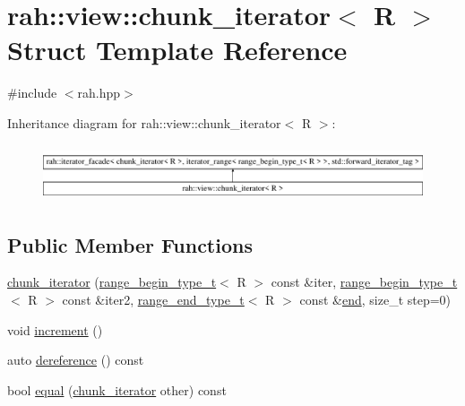 \hypertarget{structrah_1_1view_1_1chunk__iterator}{}\section{rah\+::view\+::chunk\+\_\+iterator$<$ R $>$ Struct Template Reference}
\label{structrah_1_1view_1_1chunk__iterator}


{\ttfamily \#include $<$rah.\+hpp$>$}

Inheritance diagram for rah\+::view\+::chunk\+\_\+iterator$<$ R $>$\+:\begin{figure}[H]
\begin{center}
\leavevmode
\includegraphics[height=1.669151cm]{structrah_1_1view_1_1chunk__iterator}
\end{center}
\end{figure}
\subsection*{Public Member Functions}
\begin{DoxyCompactItemize}
\item 
\mbox{\hyperlink{structrah_1_1view_1_1chunk__iterator_a2675282334475c594c96fdcc6c646895}{chunk\+\_\+iterator}} (\mbox{\hyperlink{namespacerah_afa7f59d1f37c7b9d9caed37551be9eaa}{range\+\_\+begin\+\_\+type\+\_\+t}}$<$ R $>$ const \&iter, \mbox{\hyperlink{namespacerah_afa7f59d1f37c7b9d9caed37551be9eaa}{range\+\_\+begin\+\_\+type\+\_\+t}}$<$ R $>$ const \&iter2, \mbox{\hyperlink{namespacerah_a3042a09fc211e86eea6771d01375d263}{range\+\_\+end\+\_\+type\+\_\+t}}$<$ R $>$ const \&\mbox{\hyperlink{namespacerah_aaddd1442cd76b96876e692cdefe7261d}{end}}, size\+\_\+t step=0)
\item 
void \mbox{\hyperlink{structrah_1_1view_1_1chunk__iterator_a5159787ea568a933e219a9218daf3e61}{increment}} ()
\item 
auto \mbox{\hyperlink{structrah_1_1view_1_1chunk__iterator_ad552c568bb914a6107bdcb19a5b9aa88}{dereference}} () const
\item 
bool \mbox{\hyperlink{structrah_1_1view_1_1chunk__iterator_a30a848e24020b169cf18626b2034adaf}{equal}} (\mbox{\hyperlink{structrah_1_1view_1_1chunk__iterator}{chunk\+\_\+iterator}} other) const
\end{DoxyCompactItemize}
